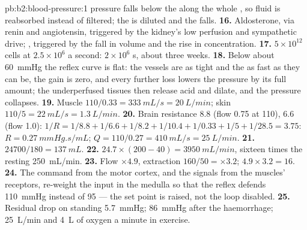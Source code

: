 \begin{solution}{pb:b2:blood-pressure:1}
pressure falls below the  along the whole ,
so fluid is reabsorbed instead of filtered; the  is diluted and
the  falls.
\textbf{16.} Aldosterone, via renin and angiotensin, triggered by the
kidney's low perfusion and sympathetic drive; ,
triggered by the fall in volume and the rise in 
concentration.
\textbf{17.} $5\times 10^{12}$ cells at $2.5\times 10^{6}$ a second:
$2\times 10^{6}$ s, about three weeks.
\textbf{18.} Below about \qty{60}{mmHg} the reflex curve is flat: the
vessels are as tight and the  as fast as they can be, the gain
is zero, and every further loss lowers the pressure by its full
amount; the underperfused tissues then release acid and dilate, and
the pressure collapses.
\textbf{19.} Muscle $110/0.33 = \qty{333}{mL/s} = \qty{20}{L/min}$;
skin $110/5 = \qty{22}{mL/s} = \qty{1.3}{L/min}$.
\textbf{20.} Brain resistance $8.8$ (flow 0.75 at 110),  $6.6$
(flow 1.0): $1/R = 1/8.8 + 1/6.6 + 1/8.2 + 1/10.4 + 1/0.33 + 1/5 +
1/28.5 = 3.75$: $R = \qty{0.27}{mmHg.s/mL}$; $Q = 110/0.27 =
\qty{410}{mL/s} = \qty{25}{L/min}$.
\textbf{21.} $\num{24700}/180 = \qty{137}{mL}$.
\textbf{22.} $24.7\times(200 - 40) = \qty{3950}{mL/min}$, sixteen times
the resting \qty{250}{mL/min}.
\textbf{23.} Flow $\times 4.9$, extraction $160/50 = \times 3.2$;
$4.9\times 3.2 = 16$.
\textbf{24.} The command from the motor cortex, and the signals from
the muscles' receptors, re-weight the  input in the
medulla so that the reflex defends \qty{110}{mmHg} instead of 95 ---
the set point is raised, not the loop disabled.
\textbf{25.} Residual drop on standing \qty{5.7}{mmHg}; \qty{86}{mmHg}
after the haemorrhage; \qty{25}{L/min} and \qty{4}{L} of oxygen a
minute in exercise.
\end{solution}
